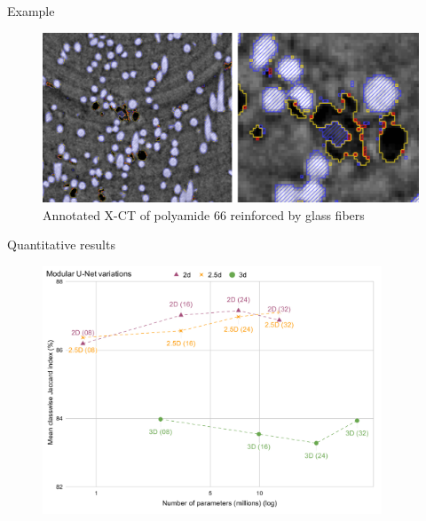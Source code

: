 \documentclass[xcolor=pdftex,dvipsnames,table,mathserif]{beamer}
\begin{document}
\begin{frame}{Example~\cite{bertoldo_modular_2021}}

\begin{figure}[ht]
  \centering
  \includegraphics[width=\textwidth]{casagrande_annotations}\\
  Annotated X-CT of polyamide 66 reinforced by glass fibers
\end{figure}

\end{frame}


\begin{frame}{Quantitative results}

\begin{figure}[ht]
  \centering
  \includegraphics[width=0.9\textwidth]{casagrande_variations}
\end{figure}


\end{frame}
\end{document}
